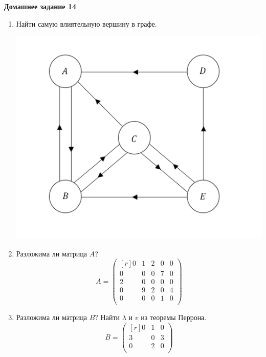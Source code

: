 \documentclass[12pt]{article}
\theoremstyle{definition}
\numberwithin{equation}{section}
\begin{document}
	\textbf{Домашнее задание 14}\begin{enumerate}
		\item Найти самую влиятельную вершину в графе.
		\begin{center}
			\includegraphics[scale=0.35]{l14_5_.png}\\
		\end{center}
		\item Разложима ли матрица $A$?
		\[A = \begin{pmatrix}[r]
		0 & 1 & 2 & 0 & 0\\
		0 & 0 & 0 & 7 & 0\\
		2 & 0 & 0 & 0 & 0\\
		0 & 9 & 2 & 0 & 4\\
		0 & 0 & 0 & 1 & 0\\
		\end{pmatrix}\]
		\item Разложима ли матрица $B$? Найти $\lambda$ и $v$ из теоремы Перрона.
		\[B = \begin{pmatrix}[r]
		0 & 1 & 0\\
		3 & 0 & 3\\
		0 & 2 & 0\\
		\end{pmatrix}\]
	\end{enumerate}
	~\\
\end{document}

